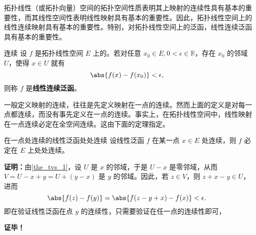
拓扑线性（或拓扑向量）空间的拓扑空间性质表明其上映射的连续性具有基本的重要性，而其线性空间性表明线性映射具有基本的重要性。因此，拓扑线性空间上的线性连续映射具有基本的重要性。特别，对拓扑线性空间上的泛函，线性连续泛函具有基本的重要性。
\begin{definition}{连续}
设 $f$ 是拓扑线性空间 $E$ 上的。若对任意 $x_0\in E,0<\epsilon\in\mathbb R$，存在 $x_0$ 的邻域 $U$，使得 $x\in U$ 就有
\begin{equation}
\abs{f(x)-f(x_0)}<\epsilon,~
\end{equation}
则称 $f$ 是\textbf{线性连续泛函}。
\end{definition}

一般定义映射的连续，往往是先定义映射在一点的连续。然而上面的定义是对每一点都连续，而没有事先定义在一点的连续。事实上，在拓扑线性空间中，线性映射在一点连续必定在全空间连续。这由下面的定理指定。
\begin{theorem}{在一点处连续的线性泛函处处连续}
设线性泛函 $f$ 在某一点 $x\in E$ 处连续，则 $f$ 必定在 $E$ 上处处连续。
\end{theorem}
\textbf{证明：}由\autoref{the_tvs_1}，设 $U$ 是 $x$ 的邻域，于是 $U-x$ 是零邻域，从而 $V=U-x+y=U+(y-x)$ 是 $y$ 的邻域。因此，若 $z\in V$，则 $z+x-y\in U$，进而
\begin{equation}
\abs{f(z)-f(y)}=\abs{f(z-y+x)-f(x)}<\epsilon.~
\end{equation}
即在验证线性泛函在点 $y$ 的连续性，只需要验证在任一点的连续性即可，


\textbf{证毕！}




